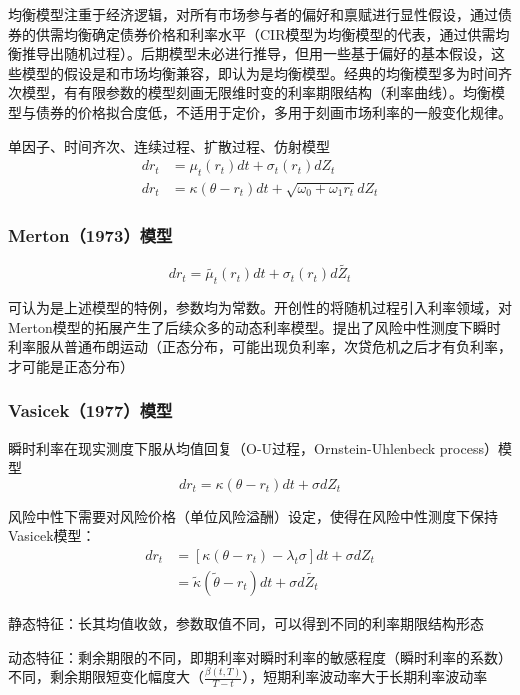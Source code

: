 \documentclass[11pt]{article}
\begin{document}
均衡模型注重于经济逻辑，对所有市场参与者的偏好和禀赋进行显性假设，通过债券的供需均衡确定债券价格和利率水平（CIR模型为均衡模型的代表，通过供需均衡推导出随机过程）。后期模型未必进行推导，但用一些基于偏好的基本假设，这些模型的假设是和市场均衡兼容，即认为是均衡模型。经典的均衡模型多为时间齐次模型，有有限参数的模型刻画无限维时变的利率期限结构（利率曲线）。均衡模型与债券的价格拟合度低，不适用于定价，多用于刻画市场利率的一般变化规律。

单因子、时间齐次、连续过程、扩散过程、仿射模型
\begin{align*}
	dr_t &= \mu_t(r_t)dt+\sigma_t(r_t)dZ_t \\
	dr_t &= \kappa(\theta-r_t)dt+\sqrt{\omega_0+\omega_1 r_t}dZ_t
\end{align*}

\subsubsection{Merton（1973）模型}

\noindent
\begin{equation*}
	dr_t = \tilde{\mu_t}(r_t)dt+\sigma_t(r_t)d\tilde{Z_t}
\end{equation*}

可认为是上述模型的特例，参数均为常数。开创性的将随机过程引入利率领域，对Merton模型的拓展产生了后续众多的动态利率模型。提出了风险中性测度下瞬时利率服从普通布朗运动（正态分布，可能出现负利率，次贷危机之后才有负利率，才可能是正态分布）

\subsubsection{Vasicek（1977）模型}

瞬时利率在现实测度下服从均值回复（O-U过程，Ornstein-Uhlenbeck process）模型
\begin{equation*}
	dr_t = \kappa(\theta-r_t)dt+\sigma dZ_t
\end{equation*}

风险中性下需要对风险价格（单位风险溢酬）设定，使得在风险中性测度下保持Vasicek模型：
\begin{align*}
	dr_t &= [\kappa(\theta-r_t)-\lambda_t\sigma]dt+\sigma dZ_t \\
	&= \tilde{\kappa}(\tilde{\theta}-r_t)dt+\sigma d\tilde{Z_t}
\end{align*}

静态特征：长其均值收敛，参数取值不同，可以得到不同的利率期限结构形态

动态特征：剩余期限的不同，即期利率对瞬时利率的敏感程度（瞬时利率的系数）不同，剩余期限短变化幅度大（$\tfrac{\beta(t,T)}{T-t}$），短期利率波动率大于长期利率波动率
\end{document}
